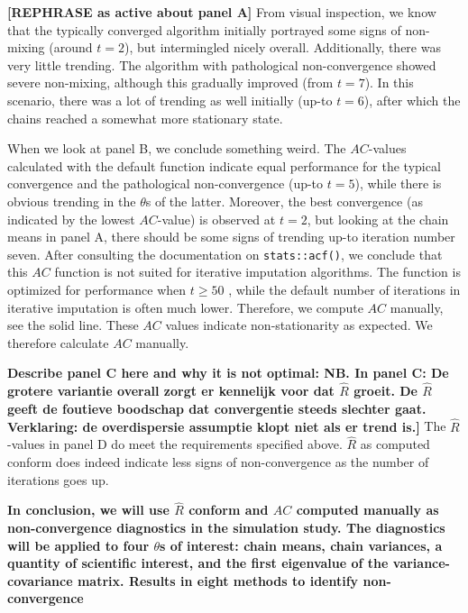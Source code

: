 \documentclass[Royal,times,sageh]{sagej}
\begin{document}
\textbf{{[}REPHRASE as active about panel A{]}} From visual inspection, we know that the typically converged algorithm initially portrayed some signs of non-mixing (around \(t=2\)), but intermingled nicely overall. Additionally, there was very little trending. The algorithm with pathological non-convergence showed severe non-mixing, although this gradually improved (from \(t=7\)). In this scenario, there was a lot of trending as well initially (up-to \(t=6\)), after which the chains reached a somewhat more stationary state.

When we look at panel B, we conclude something weird. The \(AC\)-values calculated with the default function indicate equal performance for the typical convergence and the pathological non-convergence (up-to \(t=5\)), while there is obvious trending in the \(\theta\)s of the latter. Moreover, the best convergence (as indicated by the lowest \(AC\)-value) is observed at \(t=2\), but looking at the chain means in panel A, there should be some signs of trending up-to iteration number seven. After consulting the documentation on \texttt{stats::acf()}, we conclude that this \(AC\) function is not suited for iterative imputation algorithms. The function is optimized for performance when \(t\geq50\) \citep{box15}, while the default number of iterations in iterative imputation is often much lower. Therefore, we compute \(AC\) manually, see the solid line. These \(AC\) values indicate non-stationarity as expected. We therefore calculate \(AC\) manually.

\textbf{Describe panel C here and why it is not optimal: NB. In panel C: De grotere variantie overall zorgt er kennelijk voor dat \(\widehat{R}\) groeit. De \(\widehat{R}\) geeft de foutieve boodschap dat convergentie steeds slechter gaat. Verklaring: de overdispersie assumptie klopt niet als er trend is.{]}} The \(\widehat{R}\)-values in panel D do meet the requirements specified above. \(\widehat{R}\) as computed conform \citet{veht19} does indeed indicate less signs of non-convergence as the number of iterations goes up. \textbf{\citep[explain the dip in Rhat values at t=2. Namely, because we can only use 2 of the 3 tricks by][ if the number of iterations is very low (t\textless4). That's why the \(\widehat{R}\)s are more similar to the traditional GR.]{veht19}}

\textbf{In conclusion, we will use \(\widehat{R}\) conform \citet{veht19} and \(AC\) computed manually as non-convergence diagnostics in the simulation study. The diagnostics will be applied to four \(\theta\)s of interest: chain means, chain variances, a quantity of scientific interest, and the first eigenvalue of the variance-covariance matrix. Results in eight methods to identify non-convergence}
\end{document}
